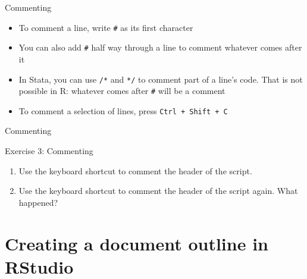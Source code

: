 \documentclass[ignorenonframetext,]{beamer}
\providecommand{\tightlist}{%
  \setlength{\itemsep}{0pt}\setlength{\parskip}{0pt}}
\begin{document}
\begin{frame}[fragile]{Commenting}

\begin{itemize}
\tightlist
\item
  To comment a line, write \texttt{\#} as its first character
\item
  You can also add \texttt{\#} half way through a line to comment
  whatever comes after it
\item
  In Stata, you can use \texttt{/*} and \texttt{*/} to comment part of a
  line's code. That is not possible in R: whatever comes after
  \texttt{\#} will be a comment
\item
  To comment a selection of lines, press \texttt{Ctrl\ +\ Shift\ +\ C}
\end{itemize}

\end{frame}

\begin{frame}{Commenting}

\begin{block}{Exercise 3: Commenting}

\begin{enumerate}
\def\labelenumi{\arabic{enumi}.}
\item
  Use the keyboard shortcut to comment the header of the script.
\item
  Use the keyboard shortcut to comment the header of the script again.
  What happened?
\end{enumerate}

\end{block}

\end{frame}

\section{Creating a document outline in
RStudio}\label{creating-a-document-outline-in-rstudio}
\end{document}
